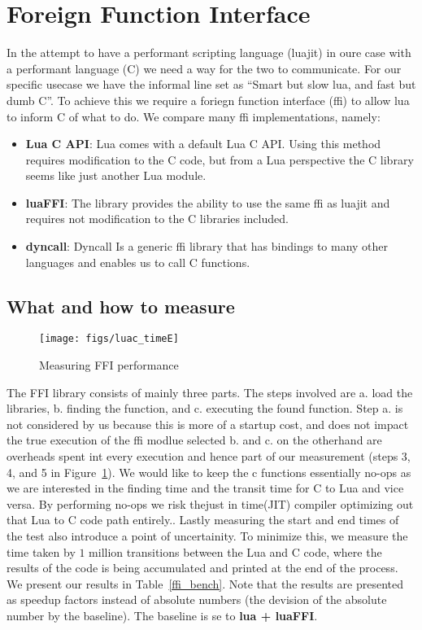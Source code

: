 \section{Foreign Function Interface}
\label{ffi}

In the attempt to have a performant scripting language (luajit) in oure case
with a performant language (C) we need a way for the two to communicate.
For our specific usecase we have the informal line set as ``Smart but slow lua,
and fast but dumb C''.
To achieve this we require a foriegn function interface (ffi) to allow lua to
inform C of what to do.
We compare many ffi implementations, namely:
\begin{itemize}
  \item {\bf Lua C API}: Lua comes with a default Lua C API. Using this method
    requires modification to the C code, but from a Lua perspective the C
    library seems like just another Lua module.
  \item {\bf luaFFI}: The library provides the ability to use the same ffi as
    luajit and requires not modification to the C libraries included.
  \item {\bf dyncall}: Dyncall\cite{dyncall} Is a generic ffi library that has
    bindings to many other languages and enables us to call C functions.  
\end{itemize}

\subsection{What and how to measure}
\begin{figure}[h]
\caption{Measuring FFI performance}
\centering
\texttt{[image: figs/luac\_timeE]}
\label{ffi_fig}
\end{figure} 

The FFI library consists of mainly three parts. 
The steps involved are a. load the libraries, b. finding the function, and c. executing the found function.
Step a. is not considered by us because this is more of a startup cost, and does not impact the true execution of the ffi modlue selected
 b. and c. on the otherhand are overheads spent int every execution and hence part of our measurement (steps 3, 4, and 5 in Figure~\ref{ffi_fig}).
We would like to keep the c functions essentially no-ops as we are interested in the finding time and the transit time for C to Lua and vice versa.
By performing no-ops we risk thejust in time(JIT) compiler optimizing out that Lua to C code path entirely..
Lastly measuring the start and end times of the test also introduce a point of uncertainity. To minimize this, we measure the time taken by $1$ million transitions between the Lua and C code, where the results of the code is being accumulated and printed at the end of the process.
We present our results in Table~\ref{ffi_bench}. Note that the results are presented as speedup factors instead of absolute numbers (the devision of the absolute number by the baseline). The baseline is se to {\bf lua + luaFFI}.

